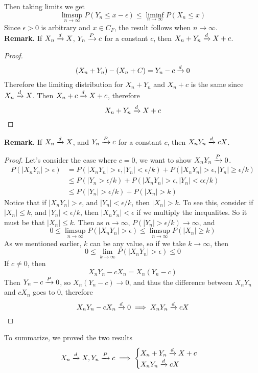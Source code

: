 Then taking limits we get
\[\limsup_{n\rightarrow\infty} P(Y_n \leq x- \epsilon) \leq \liminf_{n\rightarrow \infty} P(X_n \leq x)\]
Since $\epsilon > 0$ is arbitrary and $x \in C_F$, the result follows when $n\rightarrow \infty$. \\[2ex]
\textbf{Remark.} If $X_n \xrightarrow{d} X$, $Y_n \xrightarrow{P} c$ for a constant $c$, then $X_n + Y_n \xrightarrow{d} X + c$. 
\begin{proof}
    \[(X_n+Y_n)-(X_n + C) = Y_n - c \xrightarrow{d} 0\]
    Therefore the limiting distribution for $X_n + Y_n$ and $X_n + c$ is the same since $X_n \xrightarrow{d} X$. Then $X_n + c \xrightarrow{d} X + c$, therefore 
    \[X_n + Y_n \xrightarrow{d} X + c\]
\end{proof}
\textbf{Remark.} If $X_n \xrightarrow{d} X$, and $Y_n \xrightarrow{P} c$ for a constant $c$, then $X_nY_n \xrightarrow{d} cX$. 
\begin{proof}
    Let's consider the case where $c = 0$, we want to show $X_nY_n \xrightarrow{P} 0$.
    \begin{align*} 
        P(|X_nY_n| > \epsilon) &= P(|X_nY_n| > \epsilon, |Y_n| < \epsilon/k) + P(|X_nY_n| > \epsilon, |Y_n| \geq \epsilon/k)\\
        &\leq P(|Y_n > \epsilon/k) + P(|X_nY_n| > \epsilon, |Y_n| < \epsilon \epsilon/k)\\
        &\leq P(|Y_n| >  \epsilon/k) + P(|X_n| > k)
    \end{align*}
    Notice that if $|X_nY_n| > \epsilon$, and $|Y_n| < \epsilon/k$, then $|X_n| > k$. To see this, consider if $|X_n| \leq k$, and $|Y_n| < \epsilon/k$, then $|X_nY_n| < \epsilon$ if we multiply the inequalites. So it must be that $|X_n| \leq k$. Then as $n\rightarrow \infty$, $P(|Y_n| > \epsilon/k) \rightarrow \infty$, and 
    \[0 \leq \limsup_{n\rightarrow\infty} P(|X_nY_n| > \epsilon) \leq \limsup_{n\rightarrow\infty} P(|X_n| \geq k)\]
    As we mentioned earlier, $k$ can be any value, so if we take $k \rightarrow \infty$, then 
    \[0 \leq \lim_{k\rightarrow\infty} P(|X_nY_n| > \epsilon) \leq 0\]
    If $c \neq 0$, then 
    \[X_nY_n - cX_n = X_n(Y_n - c)\]
    Then $Y_n - c \xrightarrow{P} 0$, so $X_n(Y_n-c) \rightarrow 0$, and thus the difference between $X_nY_n$ and $cX_n$ goes to 0, therefore 
    \[X_nY_n - cX_n \xrightarrow{d} 0 \implies X_nY_n \xrightarrow{d} cX\]
\end{proof} 
To summarize, we proved the two results 
\[X_n \xrightarrow{d} X, Y_n \xrightarrow{P} c \implies \begin{cases}
    X_n + Y_n \xrightarrow{d} X + c\\
    X_nY_n \xrightarrow{d} cX
\end{cases} \]
